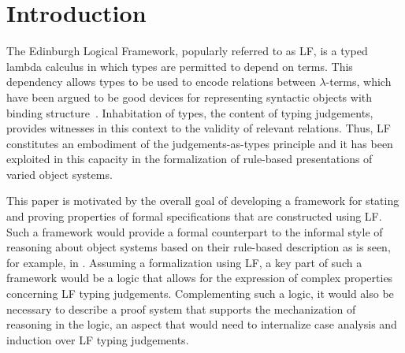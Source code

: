 \section{Introduction}\label{sec:intro}

The Edinburgh Logical Framework, popularly referred to as LF, is a
typed lambda calculus in which types are permitted to depend on
terms. 
%
This dependency allows types to be used to encode relations between 
$\lambda$-terms, which have been argued to be good devices for
representing syntactic objects with binding
structure~\cite{miller87slp,pfenning88pldi}. 
%
Inhabitation of types, the content of typing judgements,
provides witnesses in this context to the validity of relevant
relations. 
%
Thus, LF constitutes an embodiment of the judgements-as-types principle
and it has been exploited in this capacity in the formalization of
rule-based presentations of varied object systems.

This paper is motivated by the overall goal of developing a framework
for stating and proving properties of formal specifications that are
constructed using LF.
%
Such a framework would provide a formal counterpart to the
informal style of reasoning about object systems based on their
rule-based description as is seen, for example, in \cite{pierce02book}.
%
Assuming a formalization using LF, a key part of such a framework
would be a logic that allows for the expression of complex properties
concerning LF typing judgements. 
%
Complementing such a logic, it would also be necessary to describe a
proof system that supports the mechanization of reasoning in the
logic, an aspect that would need to internalize case analysis and
induction over LF typing judgements. 

